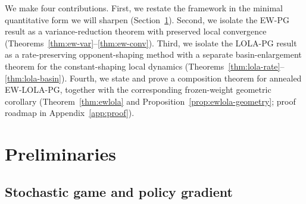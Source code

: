 \documentclass{article}
\theoremstyle{plain}
\theoremstyle{definition}
\theoremstyle{remark}
\begin{document}
We make four contributions. First, we restate the \citet{giannou2022convergence} framework in the minimal quantitative form we will sharpen (Section~\ref{sec:prelim}). Second, we isolate the EW-PG result as a variance-reduction theorem with preserved local convergence (Theorems~\ref{thm:ew-var}--\ref{thm:ew-conv}). Third, we isolate the LOLA-PG result as a rate-preserving opponent-shaping method with a separate basin-enlargement theorem for the constant-shaping local dynamics (Theorems~\ref{thm:lola-rate}--\ref{thm:lola-basin}). Fourth, we state and prove a composition theorem for annealed EW-LOLA-PG, together with the corresponding frozen-weight geometric corollary (Theorem~\ref{thm:ewlola} and Proposition~\ref{prop:ewlola-geometry}; proof roadmap in Appendix~\ref{app:proof}).

\section{Preliminaries}\label{sec:prelim}

\subsection{Stochastic game and policy gradient}
\end{document}
